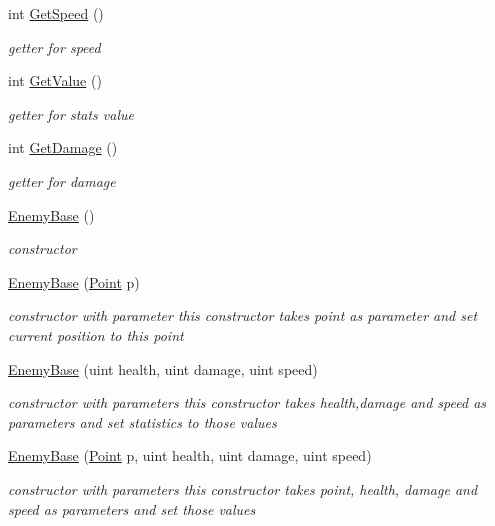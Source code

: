 \begin{DoxyCompactItemize}
int \mbox{\hyperlink{class_enemy_base_a4ab9a0cedd83a58215f37eb9e3eb9469}{Get\+Speed}} ()
\begin{DoxyCompactList}\small\item\em getter for speed \end{DoxyCompactList}\item 
int \mbox{\hyperlink{class_enemy_base_a7187da0f23cc619b9ebca37d9adb9b96}{Get\+Value}} ()
\begin{DoxyCompactList}\small\item\em getter for stats value \end{DoxyCompactList}\item 
int \mbox{\hyperlink{class_enemy_base_a6d4acbc673477c11d376bfd695e38b77}{Get\+Damage}} ()
\begin{DoxyCompactList}\small\item\em getter for damage \end{DoxyCompactList}\item 
\mbox{\label{class_enemy_base_af0e688056ae50b763bb8d8139e7e53c3}} 
\mbox{\hyperlink{class_enemy_base_af0e688056ae50b763bb8d8139e7e53c3}{Enemy\+Base}} ()
\begin{DoxyCompactList}\small\item\em constructor \end{DoxyCompactList}\item 
\mbox{\hyperlink{class_enemy_base_a3a5fda450d95f680a394c171669a6266}{Enemy\+Base}} (\mbox{\hyperlink{class_point}{Point}} p)
\begin{DoxyCompactList}\small\item\em constructor with parameter this constructor takes point as parameter and set current position to this point \end{DoxyCompactList}\item 
\mbox{\hyperlink{class_enemy_base_a6ba829dd786e4409282b022195dadea5}{Enemy\+Base}} (uint health, uint damage, uint speed)
\begin{DoxyCompactList}\small\item\em constructor with parameters this constructor takes health,damage and speed as parameters and set statistics to those values \end{DoxyCompactList}\item 
\mbox{\hyperlink{class_enemy_base_ac4982e903a34b0a98f3ada74ef7a416f}{Enemy\+Base}} (\mbox{\hyperlink{class_point}{Point}} p, uint health, uint damage, uint speed)
\begin{DoxyCompactList}\small\item\em constructor with parameters this constructor takes point, health, damage and speed as parameters and set those values \end{DoxyCompactList}\item 

\end{DoxyCompactItemize}
